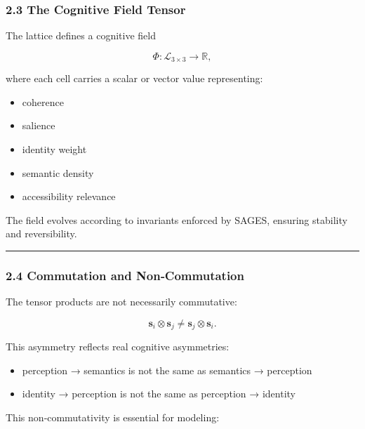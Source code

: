 \subsubsection{2.3 The Cognitive Field Tensor}\label{the-cognitive-field-tensor}

The lattice defines a cognitive field

\[
\Phi : \mathcal{L}_{3 \times 3} \rightarrow \mathbb{R},
\]

where each cell carries a scalar or vector value representing:

\begin{itemize}
\tightlist
\item
  coherence\\
\item
  salience\\
\item
  identity weight\\
\item
  semantic density\\
\item
  accessibility relevance
\end{itemize}

The field evolves according to invariants enforced by SAGES, ensuring stability and reversibility.

\begin{center}\rule{0.5\linewidth}{0.5pt}\end{center}

\subsubsection{2.4 Commutation and Non‑Commutation}\label{commutation-and-noncommutation}

The tensor products are not necessarily commutative:

\[
\mathbf{s}_i \otimes \mathbf{s}_j \neq \mathbf{s}_j \otimes \mathbf{s}_i.
\]

This asymmetry reflects real cognitive asymmetries:

\begin{itemize}
\tightlist
\item
  perception → semantics is not the same as semantics → perception\\
\item
  identity → perception is not the same as perception → identity
\end{itemize}

This non‑commutativity is essential for modeling:

